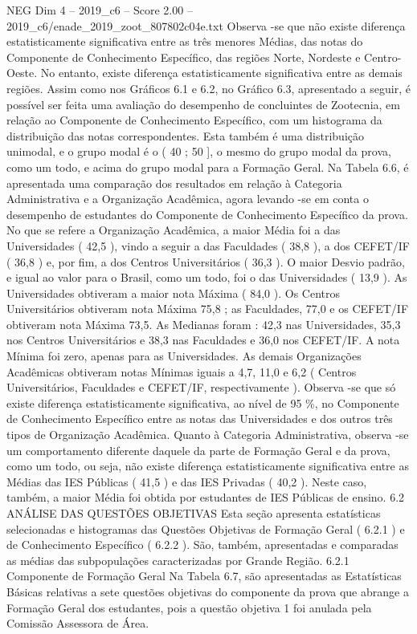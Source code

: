 \begin{textsample}{NEG Dim 4 – 2019\_c6 – Score 2.00 – 2019\_c6/enade\_2019\_zoot\_807802c04e.txt}
Observa -se que não existe diferença estatisticamente significativa entre as três menores Médias, das notas do Componente de Conhecimento Específico, das regiões Norte, Nordeste e Centro-Oeste.
No entanto, existe diferença estatisticamente significativa entre as demais regiões.
Assim como nos Gráficos 6.1 e 6.2, no Gráfico 6.3, apresentado a seguir, é possível ser feita uma avaliação do desempenho de concluintes de Zootecnia, em relação ao Componente de Conhecimento Específico, com um histograma da distribuição das notas correspondentes.
Esta também é uma distribuição unimodal, e o grupo modal é o ( 40 ; 50 ], o mesmo do grupo modal da prova, como um todo, e acima do grupo modal para a Formação Geral.
Na Tabela 6.6, é apresentada uma comparação dos resultados em relação à Categoria Administrativa e a Organização Acadêmica, agora levando -se em conta o desempenho de estudantes do Componente de Conhecimento Específico da prova.
No que se refere a Organização Acadêmica, a maior Média foi a das Universidades ( 42,5 ), vindo a seguir a das Faculdades ( 38,8 ), a dos CEFET/IF ( 36,8 ) e, por fim, a dos Centros Universitários ( 36,3 ).
O maior Desvio padrão, e igual ao valor para o Brasil, como um todo, foi o das Universidades ( 13,9 ).
As Universidades obtiveram a maior nota Máxima ( 84,0 ).
Os Centros Universitários obtiveram nota Máxima 75,8 ; as Faculdades, 77,0 e os CEFET/IF obtiveram nota Máxima 73,5.
As Medianas foram : 42,3 nas Universidades, 35,3 nos Centros Universitários e 38,3 nas Faculdades e 36,0 nos CEFET/IF.
A nota Mínima foi zero, apenas para as Universidades.
As demais Organizações Acadêmicas obtiveram notas Mínimas iguais a 4,7, 11,0 e 6,2 ( Centros Universitários, Faculdades e CEFET/IF, respectivamente ).
Observa -se que só existe diferença estatisticamente significativa, ao nível de 95 \%, no Componente de Conhecimento Específico entre as notas das Universidades e dos outros três tipos de Organização Acadêmica.
Quanto à Categoria Administrativa, observa -se um comportamento diferente daquele da parte de Formação Geral e da prova, como um todo, ou seja, não existe diferença estatisticamente significativa entre as Médias das IES Públicas ( 41,5 ) e das IES Privadas ( 40,2 ).
Neste caso, também, a maior Média foi obtida por estudantes de IES Públicas de ensino. 6.2 ANÁLISE DAS QUESTÕES OBJETIVAS Esta seção apresenta estatísticas selecionadas e histogramas das Questões Objetivas de Formação Geral ( 6.2.1 ) e de Conhecimento Específico ( 6.2.2 ).
São, também, apresentadas e comparadas as médias das subpopulações caracterizadas por Grande Região. 6.2.1 Componente de Formação Geral Na Tabela 6.7, são apresentadas as Estatísticas Básicas relativas a sete questões objetivas do componente da prova que abrange a Formação Geral dos estudantes, pois a questão objetiva 1 foi anulada pela Comissão Assessora de Área.

\end{textsample}
